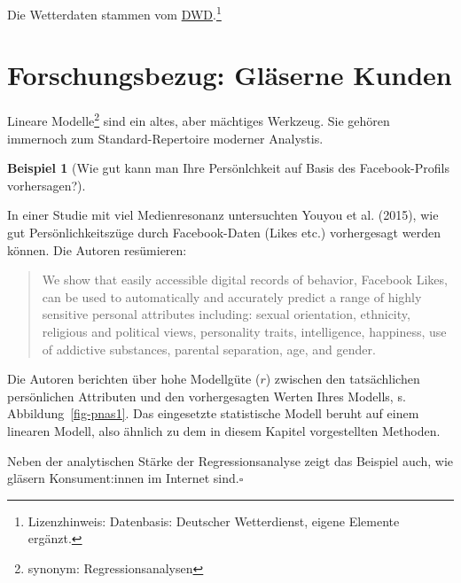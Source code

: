 \documentclass[
  letterpaper,
]{scrbook}
\theoremstyle{definition}
\newtheorem{example}{Beispiel}[chapter]
\theoremstyle{definition}
\theoremstyle{definition}
\theoremstyle{remark}
\begin{document}
Die Wetterdaten stammen vom
\href{https://opendata.dwd.de/}{DWD}.\footnote{Lizenzhinweis:
  Datenbasis: Deutscher Wetterdienst, eigene Elemente ergänzt.}

\section{Forschungsbezug: Gläserne
Kunden}\label{forschungsbezug-gluxe4serne-kunden}

Lineare Modelle\footnote{synonym: Regressionsanalysen} sind ein altes,
aber mächtiges Werkzeug. Sie gehören immernoch zum Standard-Repertoire
moderner Analystis.

\begin{example}[Wie gut kann man Ihre Persönlchkeit auf Basis des
Facebook-Profils
vorhersagen?]\protect\hypertarget{exm-kosinski}{}\label{exm-kosinski}

In einer Studie mit viel Medienresonanz untersuchten Youyou et al.
(2015), wie gut Persönlichkeitszüge durch Facebook-Daten (Likes etc.)
vorhergesagt werden können. Die Autoren resümieren:

\begin{quote}
We show that easily accessible digital records of behavior, Facebook
Likes, can be used to automatically and accurately predict a range of
highly sensitive personal attributes including: sexual orientation,
ethnicity, religious and political views, personality traits,
intelligence, happiness, use of addictive substances, parental
separation, age, and gender.
\end{quote}

Die Autoren berichten über hohe Modellgüte (\(r\)) zwischen den
tatsächlichen persönlichen Attributen und den vorhergesagten Werten
Ihres Modells, s. Abbildung~\ref{fig-pnas1}. Das eingesetzte
statistische Modell beruht auf einem linearen Modell, also ähnlich zu
dem in diesem Kapitel vorgestellten Methoden.

Neben der analytischen Stärke der Regressionsanalyse zeigt das Beispiel
auch, wie gläsern Konsument:innen im Internet sind.\(\square\)

\end{example}
\end{document}
